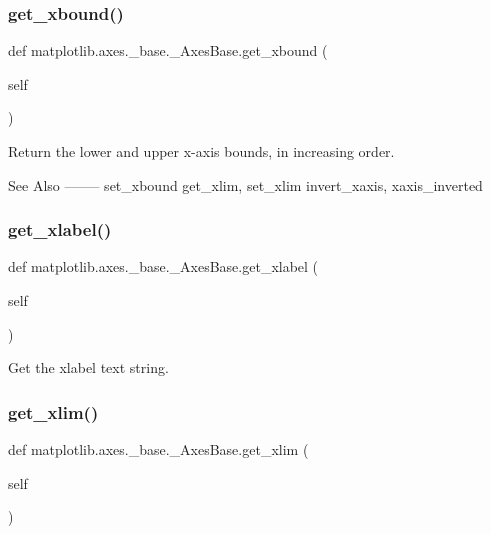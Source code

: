 \subsubsection{\texorpdfstring{get\+\_\+xbound()}{get\_xbound()}}
{\footnotesize\ttfamily def matplotlib.\+axes.\+\_\+base.\+\_\+\+Axes\+Base.\+get\+\_\+xbound (\begin{DoxyParamCaption}\item[{}]{self }\end{DoxyParamCaption})}

\begin{DoxyVerb}Return the lower and upper x-axis bounds, in increasing order.

See Also
--------
set_xbound
get_xlim, set_xlim
invert_xaxis, xaxis_inverted
\end{DoxyVerb}
 \mbox{\label{classmatplotlib_1_1axes_1_1__base_1_1__AxesBase_a11ec08f4243947683148112020aa755b}} 
\subsubsection{\texorpdfstring{get\+\_\+xlabel()}{get\_xlabel()}}
{\footnotesize\ttfamily def matplotlib.\+axes.\+\_\+base.\+\_\+\+Axes\+Base.\+get\+\_\+xlabel (\begin{DoxyParamCaption}\item[{}]{self }\end{DoxyParamCaption})}

\begin{DoxyVerb}Get the xlabel text string.
\end{DoxyVerb}
 \mbox{\label{classmatplotlib_1_1axes_1_1__base_1_1__AxesBase_a6b2af971d2b20a36ac27b7efb5d582ca}} 
\subsubsection{\texorpdfstring{get\+\_\+xlim()}{get\_xlim()}}
{\footnotesize\ttfamily def matplotlib.\+axes.\+\_\+base.\+\_\+\+Axes\+Base.\+get\+\_\+xlim (\begin{DoxyParamCaption}\item[{}]{self }\end{DoxyParamCaption})}

